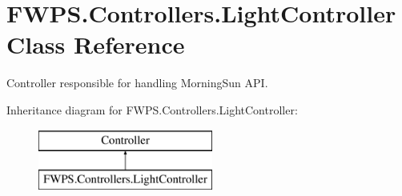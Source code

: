 \hypertarget{class_f_w_p_s_1_1_controllers_1_1_light_controller}{}\section{F\+W\+P\+S.\+Controllers.\+Light\+Controller Class Reference}
\label{class_f_w_p_s_1_1_controllers_1_1_light_controller}


Controller responsible for handling Morning\+Sun A\+PI.  


Inheritance diagram for F\+W\+P\+S.\+Controllers.\+Light\+Controller\+:\begin{figure}[H]
\begin{center}
\leavevmode
\includegraphics[height=2.000000cm]{class_f_w_p_s_1_1_controllers_1_1_light_controller}
\end{center}
\end{figure}
